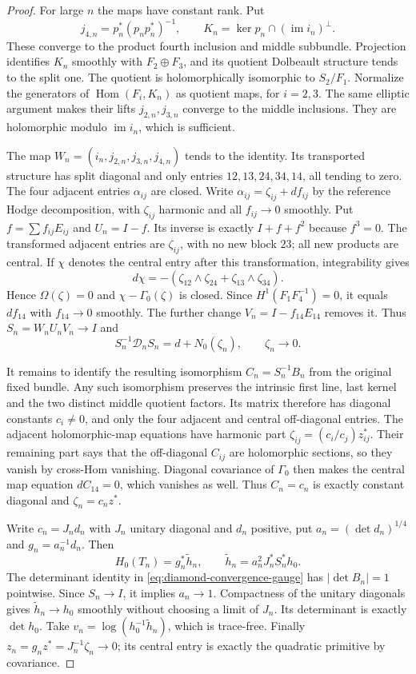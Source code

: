 \documentclass[11pt]{amsart}
\theoremstyle{definition}
\theoremstyle{remark}
\newcommand{\Hom}{\operatorname{Hom}}
\newcommand{\im}{\operatorname{im}}
\begin{document}
\begin{proof}
For large $n$ the maps have constant rank. Put
\[
 j_{4,n}=p_n^*(p_np_n^*)^{-1},\qquad
 K_n=\ker p_n\cap(\im i_n)^\perp .
\]
These converge to the product fourth inclusion and middle
subbundle. Projection identifies $K_n$ smoothly with
$F_2\oplus F_3$, and its quotient Dolbeault structure tends to
the split one. The quotient is holomorphically isomorphic to
$S_2/F_1$. Normalize the generators of $\Hom(F_i,K_n)$ as
quotient maps, for $i=2,3$. The same elliptic argument makes
their lifts $j_{2,n},j_{3,n}$ converge to the middle inclusions.
They are holomorphic modulo $\im i_n$, which is sufficient.

The map $W_n=(i_n,j_{2,n},j_{3,n},j_{4,n})$ tends to the
identity. Its transported structure has split diagonal and
only entries $12,13,24,34,14$, all tending to zero. The four
adjacent entries $\alpha_{ij}$ are closed. Write
$\alpha_{ij}=\zeta_{ij}+df_{ij}$ by the reference Hodge
decomposition, with $\zeta_{ij}$ harmonic and all $f_{ij}\to0$
smoothly. Put $f=\sum f_{ij}E_{ij}$ and $U_n=I-f$.
Its inverse is exactly $I+f+f^2$ because $f^3=0$.
The transformed adjacent entries are $\zeta_{ij}$, with no
new block $23$; all new products are central. If $\chi$ denotes
the central entry after this transformation, integrability gives
\[
 d\chi=-(\zeta_{12}\wedge\zeta_{24}
                   +\zeta_{13}\wedge\zeta_{34}).
\]
Hence $\Omega(\zeta)=0$ and $\chi-\Gamma_0(\zeta)$ is closed.
Since $H^1(F_1F_4^{-1})=0$, it equals $df_{14}$ with
$f_{14}\to0$ smoothly. The further change $V_n=I-f_{14}E_{14}$
removes it. Thus $S_n=W_nU_nV_n\to I$ and
\begin{equation}\label{eq:diamond-harmonic-normalization}
 S_n^{-1}\mathcal D_nS_n=d+N_0(\zeta_n),\qquad \zeta_n\to0 .
\end{equation}

It remains to identify the resulting isomorphism
$C_n=S_n^{-1}B_n$ from the original fixed bundle.
Any such isomorphism preserves the intrinsic first line, last
kernel and the two distinct middle quotient factors. Its matrix
therefore has diagonal constants $c_i\ne0$, and only the four
adjacent and central off-diagonal entries. The adjacent
holomorphic-map equations have harmonic part
$\zeta_{ij}=(c_i/c_j)z^*_{ij}$. Their remaining part says that
the off-diagonal $C_{ij}$ are holomorphic sections, so they vanish
by cross-Hom vanishing. Diagonal covariance of $\Gamma_0$ then
makes the central map equation $dC_{14}=0$, which vanishes as
well. Thus $C_n=c_n$ is exactly constant diagonal and
$\zeta_n=c_nz^*$.

Write $c_n=J_nd_n$ with $J_n$ unitary diagonal and $d_n$ positive,
put $a_n=(\det d_n)^{1/4}$ and $g_n=a_n^{-1}d_n$.
Then
\[
 H_0(T_n)=g_n^*\widetilde h_n,\qquad
 \widetilde h_n=a_n^2J_n^*S_n^*h_0 .
\]
The determinant identity in \eqref{eq:diamond-convergence-gauge}
has $|\det B_n|=1$ pointwise. Since $S_n\to I$, it implies
$a_n\to1$. Compactness of the unitary diagonals gives
$\widetilde h_n\to h_0$ smoothly without choosing a limit of
$J_n$. Its determinant is exactly $\det h_0$. Take
$v_n=\log(h_0^{-1}\widetilde h_n)$, which is trace-free.
Finally $z_n=g_nz^*=J_n^{-1}\zeta_n\to0$; its central entry
is exactly the quadratic primitive by covariance.
\end{proof}
\end{document}
